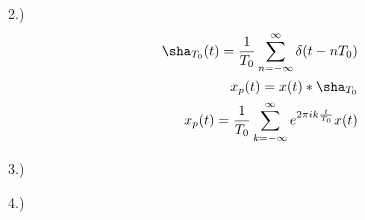 \documentclass[12pt]{article}
\begin{document}
2.) \begin{align*}
\sha_{T_0}(t) = \dfrac{1}{T_0}\sum_{n=-\infty}^{\infty} \delta(t - n{T_0}) \\
x_p(t) = x(t) \ast \sha_{T_0} \\
x_p(t) = \dfrac{1}{T_0}\sum_{k=-\infty}^{\infty}e^{2\pi i k \frac{t}{T_0}}x(t) \\
\end{align*}

3.)

4.)
\end{document}
